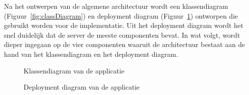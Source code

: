 Na het ontwerpen van de algemene architectuur wordt een klassendiagram (Figuur~\ref{fig:classDiagram}) en deployment diagram (Figuur~\ref{fig:deploymentDiagram}) ontworpen die gebruikt worden voor de implementatie.
Uit het deployment diagram wordt het snel duidelijk dat de server de meeste componenten bevat.
In wat volgt, wordt dieper ingegaan op de vier componenten waaruit de architectuur bestaat aan de hand van het klassendiagram en het deployment diagram.

\begin{figure}[!ht]
\centering
{}
\caption{Klassendiagram van de applicatie}
\label{fig:classDiagram}
\caption{Deployment diagram van de applicatie}
\label{fig:deploymentDiagram}
\end{figure}
\clearpage

